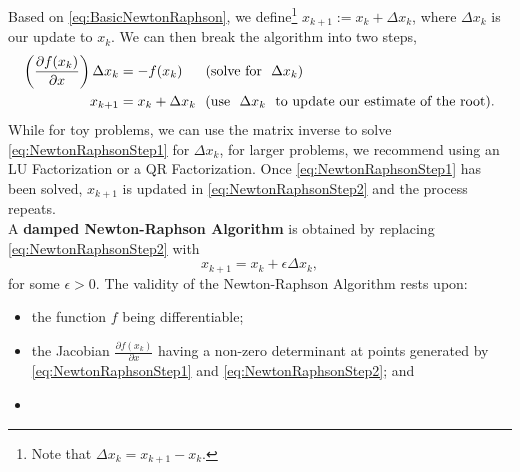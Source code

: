 \vspace*{0.2cm}
\begin{tcolorbox}[sharp corners, colback=green!30, colframe=green!80!blue,title=\textbf{Newton-Raphson Algorithm}]
Based on \eqref{eq:BasicNewtonRaphson}, we define\footnote{Note that $\Delta x_k = x_{k+1}-x_k$.} $x_{k+1}:= x_k + \Delta x_k$, where $ \Delta x_k$ is our update to $x_k$. We can then break the algorithm into two steps,
\begin{align}
\label{eq:NewtonRaphsonStep1}
\left(\frac{\partial f(x_k)}{\partial x} \right) \Delta x_{k} &= - f(x_k) \hspace*{0.58cm}(\text{solve for}~~\Delta x_k)  \\
\label{eq:NewtonRaphsonStep2}
x_{k+1}&= x_k + \Delta x_{k}~~(\text{use~~} \Delta x_k ~~\text{to update our estimate of the root}).
\end{align}
While for toy problems, we can use the matrix inverse to solve \eqref{eq:NewtonRaphsonStep1} for $\Delta x_{k}$, for larger problems, we recommend using an LU Factorization or a QR Factorization. Once \eqref{eq:NewtonRaphsonStep1}  has been solved, $x_{k+1}$ is updated in \eqref{eq:NewtonRaphsonStep2} and the process repeats.\\

A \textbf{damped Newton-Raphson Algorithm} is obtained by replacing \eqref{eq:NewtonRaphsonStep2} with   
\begin{equation}
    \label{eq:NewtonRaphsonStep3}
x_{k+1}= x_k + \epsilon \Delta x_{k},
\end{equation}
for some $\epsilon >0$.
 The validity of the Newton-Raphson Algorithm rests upon: 
\begin{itemize}
    \item the function $f$ being differentiable;
    \item the Jacobian $\frac{\partial f(x_k)}{ \partial x}$ having a non-zero determinant at points generated by \eqref{eq:NewtonRaphsonStep1} and \eqref{eq:NewtonRaphsonStep2}; and
    \item {}
\end{itemize}

\end{tcolorbox}


      
    

